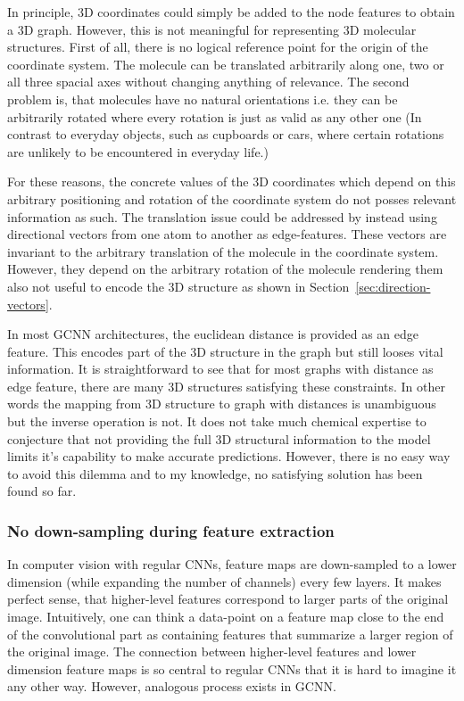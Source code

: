 In principle, 3D coordinates could simply be added to the node features to obtain a 3D graph. However, this is not meaningful for representing 3D molecular structures. First of all, there is no logical reference point for the origin of the coordinate system. The molecule can be translated arbitrarily along one, two or all three spacial axes without changing anything of relevance. The second problem is, that molecules have no natural orientations i.e. they can be arbitrarily rotated where every rotation is just as valid as any other one (In contrast to everyday objects, such as cupboards or cars, where certain rotations are unlikely to be encountered in everyday life.)

For these reasons, the concrete values of the 3D coordinates which depend on this arbitrary positioning and rotation of the coordinate system do not posses relevant information as such. The translation issue could be addressed by instead using directional vectors from one atom to another as edge-features. These vectors are invariant to the arbitrary translation of the molecule in the coordinate system. However, they depend on the arbitrary rotation of the molecule rendering them also not useful to encode the 3D structure as shown in Section~\ref{sec:direction-vectors}.

In most GCNN architectures, the euclidean distance is provided as an edge feature. This encodes part of the 3D structure in the graph but still looses vital information. It is straightforward to see that for most graphs with distance as edge feature, there are many 3D structures satisfying these constraints. In other words the mapping from 3D structure to graph with distances is unambiguous but the inverse operation is not. It does not take much chemical expertise to conjecture that not providing the full 3D structural information to the model limits it's capability to make accurate predictions. However, there is no easy way to avoid this dilemma and to my knowledge, no satisfying solution has been found so far.

\subsubsection{No down-sampling during feature extraction}

In computer vision with regular CNNs, feature maps are down-sampled to a lower dimension (while expanding the number of channels) every few layers. It makes perfect sense, that higher-level features correspond to larger parts of the original image. Intuitively, one can think a data-point on a feature map close to the end of the convolutional part as containing features that summarize a larger region of the original image. The connection between higher-level features and lower dimension feature maps is so central to regular CNNs that it is hard to imagine it any other way. However, analogous process exists in GCNN.

